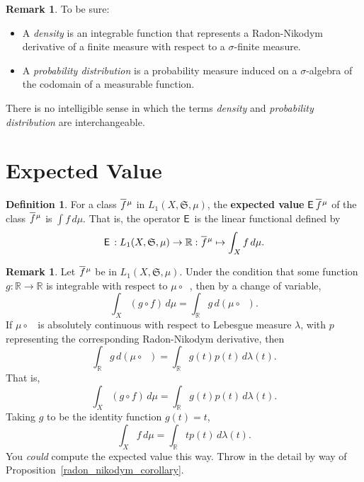 \documentclass[
twoside=true,
paper=letter,
fontsize=9pt,
pagesize=auto,
leqno,
openany,
headsepline,
overfullrule,
]{scrbook}
\theoremstyle{plain}
\theoremstyle{plain}
\theoremstyle{definition}
\newtheorem{defn}[thm]{Definition}
\newtheorem{rmk}[thm]{Remark}
\theoremstyle{bfnoteitalic}
\theoremstyle{bfnoteroman}
\newcommand{\term}[1]{\textbf{#1}\index{#1}}
\newcommand{\sigalg}[1]{\mathfrak{#1}}
\newcommand{\sfop}[1]{\mathsf{#1}}
\newcommand{\expval}{\sfop{E}\,}
\newcommand{\textsigma}{\hbox{\large{$\sigma$}}\kern-1pt}
\newcommand{\preimage}[1]{\mathop{#1^{\leftarrow}}}
\newcommand{\R}{\mathbb{R}}
\newcommand{\semiring}{\sigalg{S}}
\newcommand{\funcf}{f}
\newcommand{\funcg}{g}
\newcommand{\function}{f}
\newcommand{\measurespace}{X}
\newcommand{\measure}{\mu}
\newcommand{\measmu}{\mu}
\newcommand{\measlambda}{\lambda}
\newcommand*\xbar[1]{%
   \hbox{%
     \vbox{%
       \hrule height 0.4pt %
       \kern0.4ex%
       \hbox{%
         \ensuremath{#1}%
       }%
     }%
   }%
}
\newcommand{\lebclass}[1]{\hspace{.5pt}\xbar{#1}\hspace{0.5pt}}
\newcommand{\ellclass}[2]{\lebclass{#1}^{#2}}
\begin{document}
\begin{rmk}
To be sure:
\begin{itemize}
\item A \emph{density} is an integrable function that represents a Radon-Nikodym derivative of a finite measure with respect to  a \textsigma-finite measure.
\item A \emph{probability distribution} is a probability measure induced on a \textsigma-algebra of the codomain of a measurable function.
\end{itemize}
There is no intelligible sense in which the terms \emph{density} and \emph{probability distribution} are interchangeable.
\end{rmk}


\section{Expected Value}
\begin{defn}\label{expected_value}
For a class $\ellclass{\function}{\measure}$ in $L_1(\measurespace, \semiring,\measure)$, the
\term{expected value} $\expval{\ellclass{\function}{\measure}}$ of the class
$\ellclass{\function}{\measure}$ is
$\int\function\,d\mu$. That is, the operator $\expval$ is the linear functional defined by
\[
\expval:
L_1(\measurespace, \semiring,\measure)\to\R :
\ellclass{\function}{\measure}\mapsto \int_\measurespace \function\, d\measure.
\]
\end{defn}

\begin{rmk}
Let
$\ellclass{\function}{\measure}$ be in $L_1(\measurespace, \semiring,\measure)$.
Under the condition that some function $\funcg:\R \to\R$ is integrable with respect to
$\measmu\circ\preimage{\funcf}$, then by a change of variable,
\[
\int_\measurespace (\funcg \circ \funcf)\, d\measmu
=
\int_\R \funcg \, d(\measmu \circ \preimage{\funcf}).
\]
If  $\measmu\circ\preimage{\funcf}$ is absolutely continuous with respect to Lebesgue measure
$\measlambda$, with $p$ representing the corresponding Radon-Nikodym derivative, then
\[
\int_\R \funcg \, d(\measmu \circ \preimage{\funcf})
=
\int_\R \funcg(t) p(t) \, d\measlambda(t).
\]
That is,
\[
\int_\measurespace (\funcg \circ \funcf)\, d\measmu
=
\int_\R \funcg(t) p(t) \, d\measlambda(t).
\]
Taking $\funcg$ to be the identity function $\funcg(t)=t$,
\[
\int_\measurespace \funcf \, d\measmu
=
\int_\R t p(t) \, d\measlambda(t).
\]
You \emph{could} compute the expected value this way. Throw in the detail by way of Proposition~\ref{radon_nikodym_corollary}.
\end{rmk}
\end{document}
